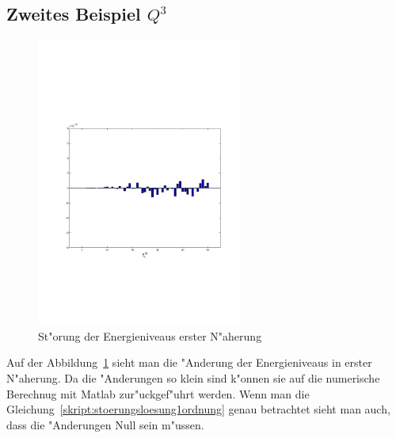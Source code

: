 \begin{refsection}
\subsection{Zweites Beispiel $Q^3$}


\begin{figure}	%
\centering
\includegraphics[width=0.6\textwidth]{anharmonisch/images/x3/EK1.pdf}
\caption{St"orung der Energieniveaus erster N"aherung
\label{skript:x3_EK1}}
\end{figure}

Auf der Abbildung~\ref{skript:x3_EK1} sieht man die "Anderung der Energieniveaus in erster N"aherung. Da die "Anderungen so klein sind k"onnen sie auf die numerische Berechnug mit Matlab zur"uckgef"uhrt werden. Wenn man die Gleichung~\ref{skript:stoerungsloesung1ordnung} genau betrachtet sieht man auch, dass die "Anderungen Null sein m"ussen.


\end{refsection}
